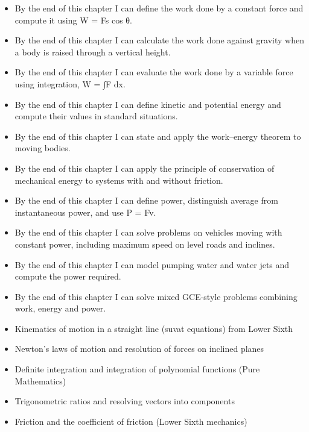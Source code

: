 \documentclass[11pt]{article}
\begin{document}
\begin{objectifs}
\begin{itemize}
\item By the end of this chapter I can define the work done by a constant force and compute it using W = Fs cos θ.
\item By the end of this chapter I can calculate the work done against gravity when a body is raised through a vertical height.
\item By the end of this chapter I can evaluate the work done by a variable force using integration, W = ∫F dx.
\item By the end of this chapter I can define kinetic and potential energy and compute their values in standard situations.
\item By the end of this chapter I can state and apply the work–energy theorem to moving bodies.
\item By the end of this chapter I can apply the principle of conservation of mechanical energy to systems with and without friction.
\item By the end of this chapter I can define power, distinguish average from instantaneous power, and use P = Fv.
\item By the end of this chapter I can solve problems on vehicles moving with constant power, including maximum speed on level roads and inclines.
\item By the end of this chapter I can model pumping water and water jets and compute the power required.
\item By the end of this chapter I can solve mixed GCE-style problems combining work, energy and power.
\end{itemize}
\end{objectifs}

\begin{prerequis}
\begin{itemize}
\item Kinematics of motion in a straight line (suvat equations) from Lower Sixth
\item Newton's laws of motion and resolution of forces on inclined planes
\item Definite integration and integration of polynomial functions (Pure Mathematics)
\item Trigonometric ratios and resolving vectors into components
\item Friction and the coefficient of friction (Lower Sixth mechanics)
\end{itemize}
\end{prerequis}
\end{document}
